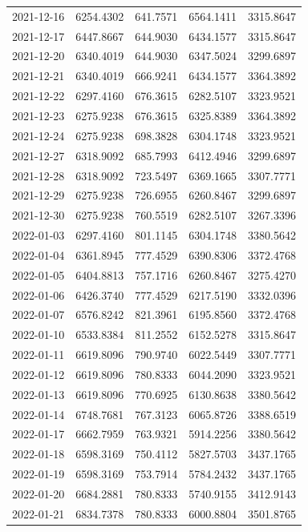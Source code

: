 \begin{footnotesize}
\begin{longtable}{lllll}
2021-12-16 & 6254.4302 & 641.7571 & 6564.1411 & 3315.8647 \\
2021-12-17 & 6447.8667 & 644.9030 & 6434.1577 & 3315.8647 \\
2021-12-20 & 6340.4019 & 644.9030 & 6347.5024 & 3299.6897 \\
2021-12-21 & 6340.4019 & 666.9241 & 6434.1577 & 3364.3892 \\
2021-12-22 & 6297.4160 & 676.3615 & 6282.5107 & 3323.9521 \\
2021-12-23 & 6275.9238 & 676.3615 & 6325.8389 & 3364.3892 \\
2021-12-24 & 6275.9238 & 698.3828 & 6304.1748 & 3323.9521 \\
2021-12-27 & 6318.9092 & 685.7993 & 6412.4946 & 3299.6897 \\
2021-12-28 & 6318.9092 & 723.5497 & 6369.1665 & 3307.7771 \\
2021-12-29 & 6275.9238 & 726.6955 & 6260.8467 & 3299.6897 \\
2021-12-30 & 6275.9238 & 760.5519 & 6282.5107 & 3267.3396 \\
2022-01-03 & 6297.4160 & 801.1145 & 6304.1748 & 3380.5642 \\
2022-01-04 & 6361.8945 & 777.4529 & 6390.8306 & 3372.4768 \\
2022-01-05 & 6404.8813 & 757.1716 & 6260.8467 & 3275.4270 \\
2022-01-06 & 6426.3740 & 777.4529 & 6217.5190 & 3332.0396 \\
2022-01-07 & 6576.8242 & 821.3961 & 6195.8560 & 3372.4768 \\
2022-01-10 & 6533.8384 & 811.2552 & 6152.5278 & 3315.8647 \\
2022-01-11 & 6619.8096 & 790.9740 & 6022.5449 & 3307.7771 \\
2022-01-12 & 6619.8096 & 780.8333 & 6044.2090 & 3323.9521 \\
2022-01-13 & 6619.8096 & 770.6925 & 6130.8638 & 3380.5642 \\
2022-01-14 & 6748.7681 & 767.3123 & 6065.8726 & 3388.6519 \\
2022-01-17 & 6662.7959 & 763.9321 & 5914.2256 & 3380.5642 \\
2022-01-18 & 6598.3169 & 750.4112 & 5827.5703 & 3437.1765 \\
2022-01-19 & 6598.3169 & 753.7914 & 5784.2432 & 3437.1765 \\
2022-01-20 & 6684.2881 & 780.8333 & 5740.9155 & 3412.9143 \\
2022-01-21 & 6834.7378 & 780.8333 & 6000.8804 & 3501.8765 \\

\end{longtable}
\end{footnotesize}
